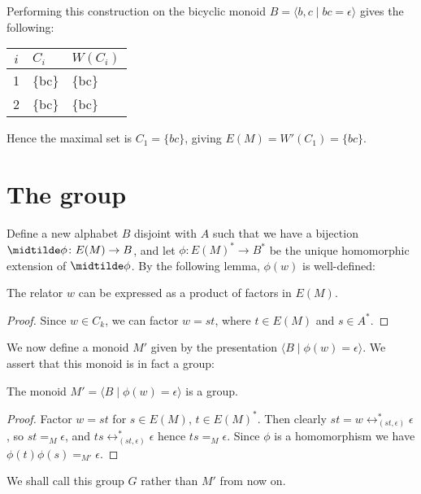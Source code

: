 \documentclass[libertine,widepage,nosubthm]{lmaths}
\begin{document}
\begin{example}
	Performing this construction on the bicyclic monoid $B = \langle b, c \mid bc = \epsilon \rangle$ gives the following:

	\begin{center}
	\begin{tabular}{c|ll}
		$i$ & $C_i$ & $W(C_i)$ \\
		\hline
		1 & \{bc\} & \{bc\} \\
		2 & \{bc\} & \{bc\}
	\end{tabular}
	\end{center}

	Hence the maximal set is $C_1 = \{bc\}$, giving $E(M) = W'(C_1) = \{ bc \}$.
\end{example}

\section{The group}
Define a new alphabet $B$ disjoint with $A$ such that we have a bijection $\midtilde\phi \colon E(M) \to B$, and let $\phi \colon E(M)^* \to B^*$ be the unique homomorphic extension of $\midtilde\phi$. By the following lemma, $\phi(w)$ is well-defined:

\begin{lemma} \label{lma:relator-factors-E(M)}
	The relator $w$ can be expressed as a product of factors in $E(M)$.
\end{lemma}
\begin{proof}
	Since $w \in C_k$, we can factor $w = st$, where $t \in E(M)$ and $s \in A^*$.
\end{proof}

We now define a monoid $M'$ given by the presentation $\langle B \mid \phi(w) = \epsilon \rangle$. We assert that this monoid is in fact a group:

\begin{lemma}
	The monoid $M' = \langle B \mid \phi(w) = \epsilon\rangle$ is a group.
\end{lemma}
\begin{proof}
	Factor $w = st$ for $s \in E(M)$, $t \in E(M)^*$. Then clearly $st = w \leftrightarrow^*_{(st, \epsilon)} \epsilon$, so $st =_M \epsilon$, and $ts \leftrightarrow^*_{(st, \epsilon)} \epsilon$ hence $ts =_M \epsilon$. Since $\phi$ is a homomorphism we have $\phi(t)\phi(s) =_{M'} \epsilon$.
\end{proof}

We shall call this group $G$ rather than $M'$ from now on.
\end{document}
